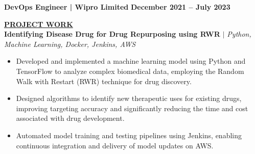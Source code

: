 \documentclass{article}
\begin{document}
\noindent \textbf{DevOps Engineer | Wipro Limited} \hfill \textbf{December 2021 – July 2023}


%
%


\noindent \textbf{\underline{PROJECT WORK}} \\
\noindent \textbf{Identifying Disease Drug for Drug Repurposing using RWR} \textit{$\mid$ Python, Machine Learning, Docker, Jenkins, AWS} \hfill \textbf{}
\begin{itemize}[noitemsep,nolistsep,leftmargin=*]
\item {\small Developed and implemented a machine learning model using Python and TensorFlow to analyze complex biomedical data, employing the Random Walk with Restart (RWR) technique for drug discovery.}
\item {\small Designed algorithms to identify new therapeutic uses for existing drugs, improving targeting accuracy and significantly reducing the time and cost associated with drug development.}
\item {\small Automated model training and testing pipelines using Jenkins, enabling continuous integration and delivery of model updates on AWS.}
\end{itemize}
\end{document}
